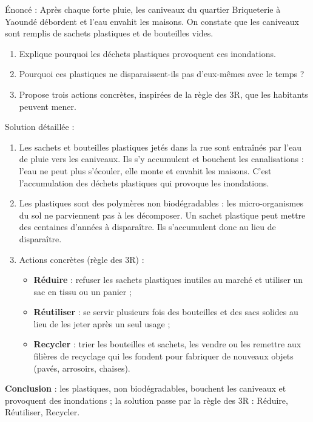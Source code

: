 \documentclass[11pt]{article}
\newcommand{\cle}[1]{{\popxbold\color{popdark}#1}}
\begin{document}
\begin{exoresolu}
Énoncé : Après chaque forte pluie, les caniveaux du quartier Briqueterie à Yaoundé débordent et l'eau envahit les maisons. On constate que les caniveaux sont remplis de sachets plastiques et de bouteilles vides.
\begin{enumerate}
\item Explique pourquoi les déchets plastiques provoquent ces inondations.
\item Pourquoi ces plastiques ne disparaissent-ils pas d'eux-mêmes avec le temps ?
\item Propose trois actions concrètes, inspirées de la règle des 3R, que les habitants peuvent mener.
\end{enumerate}
\tcblower
Solution détaillée :
\begin{enumerate}
\item Les sachets et bouteilles plastiques jetés dans la rue sont entraînés par l'eau de pluie vers les caniveaux. Ils s'y accumulent et \cle{bouchent} les canalisations : l'eau ne peut plus s'écouler, elle monte et envahit les maisons. C'est l'accumulation des déchets plastiques qui provoque les inondations.
\item Les plastiques sont des polymères \cle{non biodégradables} : les micro-organismes du sol ne parviennent pas à les décomposer. Un sachet plastique peut mettre des \cle{centaines d'années} à disparaître. Ils s'accumulent donc au lieu de disparaître.
\item Actions concrètes (règle des 3R) :
\begin{itemize}
\item \textbf{Réduire} : refuser les sachets plastiques inutiles au marché et utiliser un sac en tissu ou un panier ;
\item \textbf{Réutiliser} : se servir plusieurs fois des bouteilles et des sacs solides au lieu de les jeter après un seul usage ;
\item \textbf{Recycler} : trier les bouteilles et sachets, les vendre ou les remettre aux filières de recyclage qui les fondent pour fabriquer de nouveaux objets (pavés, arrosoirs, chaises).
\end{itemize}
\end{enumerate}
\textbf{Conclusion} : les plastiques, non biodégradables, bouchent les caniveaux et provoquent des inondations ; la solution passe par la règle des 3R : Réduire, Réutiliser, Recycler.
\end{exoresolu}
\end{document}

